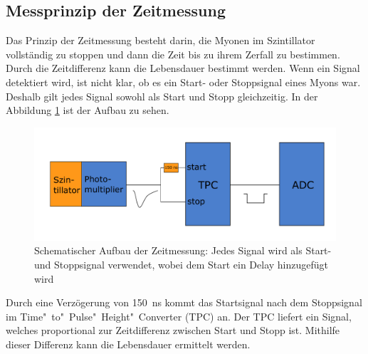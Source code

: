 \documentclass[12pt,a4paper,ngerman]{report}
\begin{document}
	\subsection{Messprinzip der Zeitmessung}
	Das Prinzip der Zeitmessung besteht darin, die Myonen im Szintillator vollständig zu stoppen und dann die Zeit bis zu ihrem Zerfall zu bestimmen. Durch die Zeitdifferenz kann die Lebensdauer bestimmt werden. Wenn ein Signal detektiert wird, ist nicht klar, ob es ein Start- oder Stoppsignal eines Myons war. Deshalb gilt jedes Signal sowohl als Start und Stopp gleichzeitig. In der Abbildung \ref{img:ZeitEinfach} ist der Aufbau zu sehen.
	\begin{figure}[ht]
		\centering
		\includegraphics[width=\textwidth]{Bilder/ZeitmessungEinfach.pdf}		
		\caption[Schematischer Aufbau der Zeitmessung]{Schematischer Aufbau der Zeitmessung: Jedes Signal wird als Start- und Stoppsignal verwendet, wobei dem Start ein Delay hinzugefügt wird }
		\label{img:ZeitEinfach}
	\end{figure}
	Durch eine Verzögerung von \SI{150}{\nano \second} kommt das Startsignal nach dem Stoppsignal im Time"~to"~Pulse"~Height"~Converter (TPC) an. Der TPC liefert ein Signal, welches proportional zur Zeitdifferenz zwischen Start und Stopp ist. Mithilfe dieser Differenz kann die Lebensdauer ermittelt werden.\\
\end{document}
